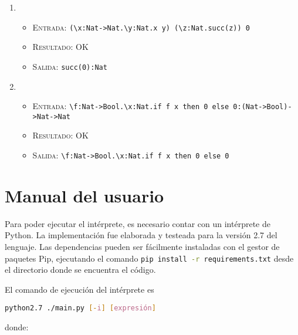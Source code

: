 \documentclass[11pt]{article}
\begin{document}
\begin{enumerate}
\begin{itemize}
    \item \textsc{Salida:}    \verb|\f:Nat->Nat.\x:Nat.f x:(Nat->Nat)->Nat->Nat|
    \end{itemize}
\item \begin{itemize}
    \item \textsc{Entrada:}   \verb|(\x:Nat->Nat.\y:Nat.x y) (\z:Nat.succ(z)) 0|
    \item \textsc{Resultado:} OK
    \item \textsc{Salida:}    \verb|succ(0):Nat|
    \end{itemize}
\item \begin{itemize}
    \item \textsc{Entrada:}   \verb|\f:Nat->Bool.\x:Nat.if f x then 0 else 0:(Nat->Bool)->Nat->Nat|
    \item \textsc{Resultado:} OK
    \item \textsc{Salida:}    \verb|\f:Nat->Bool.\x:Nat.if f x then 0 else 0|
    \end{itemize}
\end{enumerate}


\section{Manual del usuario}


Para poder ejecutar el intérprete, es necesario contar con un intérprete de
Python. La implementación fue elaborada y testeada para la versión 2.7 del
lenguaje. Las dependencias pueden ser fácilmente instaladas con el gestor de
paquetes Pip, ejecutando el comando \lstinline[language=bash]
{pip install -r requirements.txt} desde el directorio donde se encuentra el
código.

El comando de ejecución del intérprete es
\begin{center}\lstinline[language=bash]
	{python2.7 ./main.py [-i] [expresión]}
\end{center}
\noindent donde:
\end{document}
